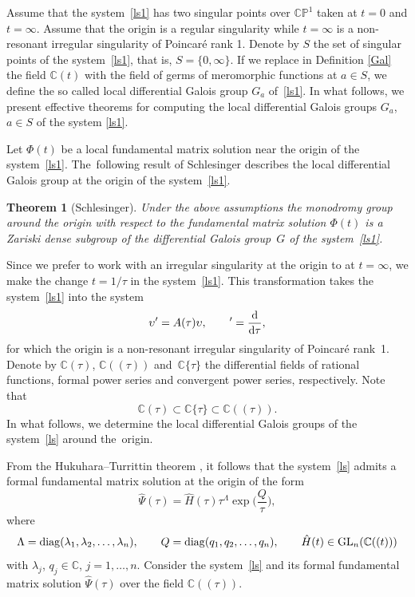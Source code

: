 \documentclass[10pt,a4paper]{amsart}
\numberwithin{equation}{section}
\newtheorem{Theorem}{Theorem}[section]
\begin{document}
 Assume that the system~\eqref{ls1} has two singular points over $\mathbb{C}\mathbb{P}^1$ taken at $t=0$ and $t=\infty$. Assume that
 the origin is a regular singularity while $t=\infty$ is a
 non-resonant irregular singularity of
 Poincar\'{e} rank 1. Denote by $S$ the set of singular points of the system~\eqref{ls1}, that is, $S=\{0, \infty\}$.
 If we replace in Definition \ref{Gal} the field $\mathbb{C}(t)$ with the field of germs of meromorphic functions at $a\in S$, we define the so called local differential Galois
 group $G_a$ of~\eqref{ls1}. In what follows, we present effective theorems for computing the local differential Galois groups $G_a$, $a\in S$ of the system
 \eqref{ls1}.

 Let $\Phi(t)$ be a local fundamental matrix solution near the origin of the system~\eqref{ls1}.
 The~following result of Schlesinger \cite{Sch} describes the local differential Galois group at the origin of the system~\eqref{ls1}.

 \begin{Theorem}[Schlesinger]\label{reg}
 Under the above assumptions the monodromy group around the origin with respect to the fundamental matrix solution
 $\Phi(t)$ is a Zariski dense subgroup of the differential Galois group~$G$ of the
 system~\eqref{ls1}.
 \end{Theorem}

Since we prefer to work with an irregular singularity at the origin to at $t=\infty$, we make the change $t=1/\tau$ in the
 system~\eqref{ls1}.
 This transformation takes the system~\eqref{ls1} into the system
 \begin{equation}
 \upsilon'=A(\tau) \upsilon,\qquad '=\frac{{\rm d}}{{\rm d} \tau} ,\label{ls}
 \end{equation}
 for which the origin is a non-resonant irregular singularity of Poincar\'{e} rank~1.
 Denote by $\mathbb{C}(\tau)$, $\mathbb{C}((\tau))$ and~$\mathbb{C}\{\tau\}$ the differential fields of rational functions, formal power series and convergent
 power series, respectively. Note that
 \[
 \mathbb{C}(\tau) \subset \mathbb{C}\{\tau\} \subset \mathbb{C}((\tau)) .
 \]
 In what follows, we determine the local differential Galois groups of the system~\eqref{ls} around the~origin.



 From the Hukuhara--Turrittin theorem \cite{W}, it follows that the
 system~\eqref{ls} admits a formal fundamental matrix solution at the origin of the form
 \begin{equation}
 \hat{\Psi}(\tau)=\hat{H}(\tau) \tau^{\Lambda} \exp\biggl(\frac{Q}{\tau}\biggr) ,\label{fls}
 \end{equation}
 where
 \[
 \Lambda={\rm diag} (\lambda_1, \lambda_2, \dots, \lambda_n),\qquad
 Q={\rm diag} (q_1, q_2, \dots, q_n),\qquad \hat{H}(t)\in{\rm GL}_n(\mathbb{C}((t)))
 \]
 with $\lambda_j$, $q_j \in\mathbb{C}$, $j=1, \dots, n$. Consider the system~\eqref{ls} and its formal fundamental matrix solution
 $\hat{\Psi}(\tau)$ over the field $\mathbb{C}((\tau))$.
\end{document}

